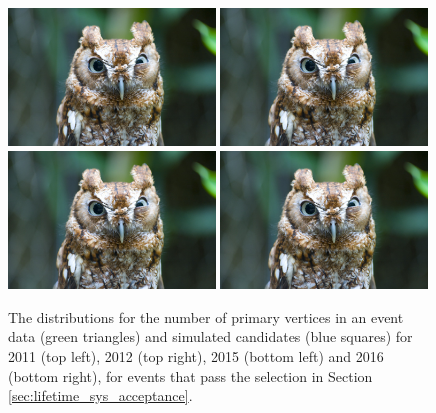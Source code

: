 {\begin{figure}[ht]
  \centering
    \includegraphics[width=0.49\textwidth]{./Figs/placeholder.jpeg}
    \includegraphics[width=0.49\textwidth]{./Figs/placeholder.jpeg}
    \includegraphics[width=0.49\textwidth]{./Figs/placeholder.jpeg}
    \includegraphics[width=0.49\textwidth]{./Figs/placeholder.jpeg}
  \caption{The distributions for the number of primary vertices in an event \bdkpi data (green triangles) and simulated candidates (blue squares) for 2011 (top left), 2012 (top right), 2015 (bottom left) and 2016 (bottom right), for events that pass the selection in Section \ref{sec:lifetime_sys_acceptance}.}
  \label{fig:Bd2KPi_nPVs_MC_data_comparison}
\end{figure}


}
